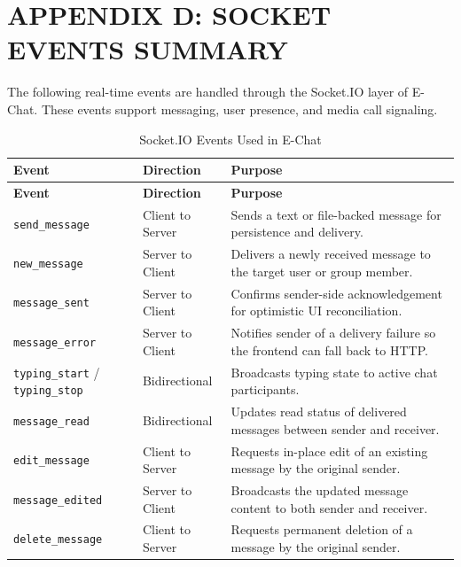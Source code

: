 \documentclass[12pt,a4paper,oneside]{report}
\begin{document}
\cleardoublepage

\chapter*{APPENDIX D: SOCKET EVENTS SUMMARY}
{}
\label{front:appendix-d}
\thispagestyle{plain}

The following real-time events are handled through the Socket.IO layer of
E-Chat. These events support messaging, user presence, and media call signaling.

\begin{longtable}{|p{4.8cm}|p{2.8cm}|p{6.2cm}|}
\caption{Socket.IO Events Used in E-Chat} \label{tab:socketevents} \\
\hline
\textbf{Event} & \textbf{Direction} & \textbf{Purpose} \\
\hline
\endfirsthead
\hline
\textbf{Event} & \textbf{Direction} & \textbf{Purpose} \\
\hline
\endhead
\hline
\endfoot
\texttt{send\_message} & Client to Server & Sends a text or file-backed message for persistence and delivery. \\
\hline
\texttt{new\_message} & Server to Client & Delivers a newly received message to the target user or group member. \\
\hline
\texttt{message\_sent} & Server to Client & Confirms sender-side acknowledgement for optimistic UI reconciliation. \\
\hline
\texttt{message\_error} & Server to Client & Notifies sender of a delivery failure so the frontend can fall back to HTTP. \\
\hline
\texttt{typing\_start} / \texttt{typing\_stop} & Bidirectional & Broadcasts typing state to active chat participants. \\
\hline
\texttt{message\_read} & Bidirectional & Updates read status of delivered messages between sender and receiver. \\
\hline
\texttt{edit\_message} & Client to Server & Requests in-place edit of an existing message by the original sender. \\
\hline
\texttt{message\_edited} & Server to Client & Broadcasts the updated message content to both sender and receiver. \\
\hline
\texttt{delete\_message} & Client to Server & Requests permanent deletion of a message by the original sender. \\

\end{longtable}
\end{document}
